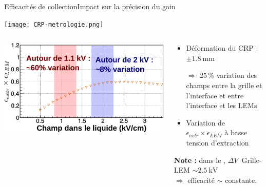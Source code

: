     \begin{frame}{Efficacités de collection}{Impact sur la précision du gain}
        \begin{center} \vspace{-0.5cm}\texttt{[image: CRP-metrologie.png]} \end{center}
        \begin{scriptsize}
            \begin{columns}
                \begin{column}{0.6\textwidth}
                    \centering \includegraphics[width=\textwidth]{./pictures/extr_eff.pdf}
                \end{column}\hfill
                \begin{column}{0.4\textwidth}
                    \begin{itemize}
          					\item Déformation du CRP : $\pm\SI{1.8}{\milli\meter}$
          					\item[$\Rightarrow$]  25\,\% variation des champs entre la grille et l'interface et entre l'interface et les LEMs
          					\item Variation de $\epsilon_{extr}\times\epsilon_{LEM}$ à basse tension d'extraction
          				\end{itemize}
                     \textbf{Note : } dans le \SSS{},  $\Delta V$~Grille-LEM $\sim\SI{2.5}{\kilo\volt}$\\
                     $\Rightarrow$ efficacité $\sim$ constante.
                \end{column}
            \end{columns}
        \end{scriptsize}
    \end{frame}

